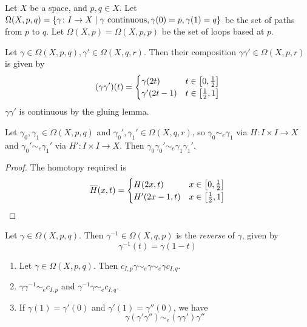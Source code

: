 \begin{definition}
	Let \( X \) be a space, and \( p, q \in X \).
	Let \( \Omega(X,p,q) = \qty{\gamma \colon I \to X \mid \gamma \text{ continuous}, \gamma(0) = p, \gamma(1) = q} \) be the set of paths from \( p \) to \( q \).
	Let \( \Omega(X,p) = \Omega(X,p,p) \) be the set of loops based at \( p \).
\end{definition}
\begin{definition}
	Let \( \gamma \in \Omega(X,p,q), \gamma' \in \Omega(X,q,r) \).
	Then their composition \( \gamma \gamma' \in \Omega(X,p,r) \) is given by
	\[ (\gamma\gamma')(t) = \begin{cases}
		\gamma(2t) & t \in \qty[0,\frac 12] \\
		\gamma'(2t-1) & t \in \qty[\frac 12, 1]
	\end{cases} \]
	\( \gamma\gamma' \) is continuous by the gluing lemma.
\end{definition}
\begin{lemma}
	Let \( \gamma_0, \gamma_1 \in \Omega(X,p,q) \) and \( \gamma_0', \gamma_1' \in \Omega(X,q,r) \), so \( \gamma_0 \sim_e \gamma_1 \) via \( H \colon I \times I \to X \) and \( \gamma_0' \sim_e \gamma_1' \) via \( H' \colon I \times I \to X \).
	Then \( \gamma_0 \gamma_0' \sim_e \gamma_1 \gamma_1' \).
\end{lemma}
\begin{proof}
	The homotopy required is
	\[ \overline H(x,t) = \begin{cases}
		H(2x,t) & x \in \qty[0,\frac 12] \\
		H'(2x-1,t) & x \in \qty[\frac 12, 1]
	\end{cases} \]
\end{proof}
\begin{definition}
	Let \( \gamma \in \Omega(X,p,q) \).
	Then \( \gamma^{-1} \in \Omega(X,q,p) \) is the \emph{reverse} of \( \gamma \), given by
	\[ \gamma^{-1}(t) = \gamma(1-t) \]
\end{definition}
\begin{proposition}
	\begin{enumerate}
		\item Let \( \gamma \in \Omega(X,p,q) \).
			Then \( c_{I,p} \gamma \sim_e \gamma \sim_e \gamma c_{I,q} \).
		\item \( \gamma \gamma^{-1} \sim_e c_{I,p} \) and \( \gamma^{-1} \gamma \sim_e c_{I,q} \).
		\item If \( \gamma(1) = \gamma'(0) \) and \( \gamma'(1) = \gamma''(0) \), we have
			\[ \gamma (\gamma' \gamma'') \sim_e (\gamma \gamma') \gamma'' \]
	\end{enumerate}
\end{proposition}
